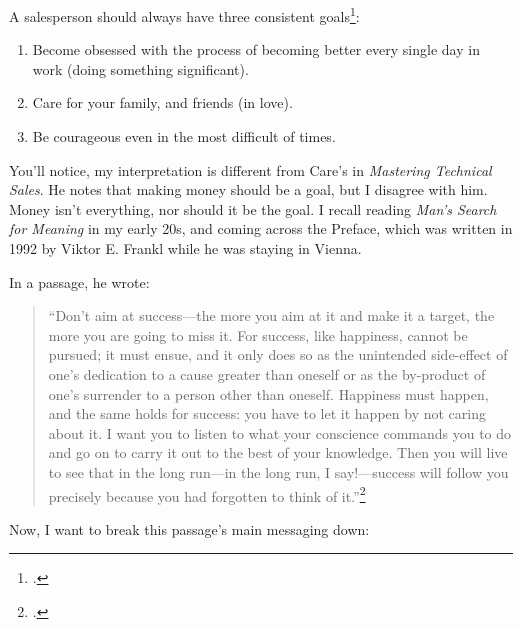 A salesperson should always have three consistent goals\footcite{care_2014_mastering}:
\begin{enumerate}
    \item Become obsessed with the process of becoming better every single day in work (doing something significant).
    \item Care for your family, and friends (in love).
    \item Be courageous even in the most difficult of times.
\end{enumerate}

You'll notice, my interpretation is different from Care's in \textit{Mastering Technical Sales}. He notes that making money should be a goal, but I disagree with him. Money isn't everything, nor should it be the goal. I recall reading \textit{Man's Search for Meaning} in my early 20s, and coming across the Preface, which was written in 1992 by Viktor E. Frankl while he was staying in Vienna.

In a passage, he wrote:

\begin{quote}
    ``Don't aim at success---the more you aim at it and make it a target, the more you are going to miss it. For success, like happiness, cannot be pursued; it must ensue, and it only does so as the unintended side-effect of one's dedication to a cause greater than oneself or as the by-product of one's surrender to a person other than oneself. Happiness must happen, and the same holds for success: you have to let it happen by not caring about it. I want you to listen to what your conscience commands you to do and go on to carry it out to the best of your knowledge. Then you will live to see that in the long run---in the long run, I say!---success will follow you precisely because you had forgotten to think of it.''\footcite{frankl_2017_mans}
\end{quote}

Now, I want to break this passage's main messaging down:

